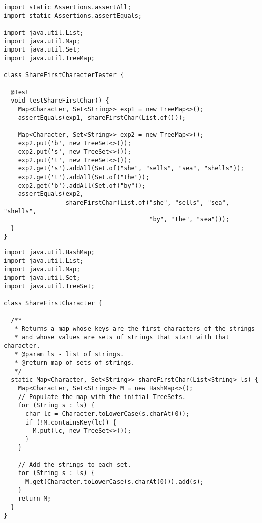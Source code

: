 \begin{lstlisting}[language=MyJava]
import static Assertions.assertAll;
import static Assertions.assertEquals;

import java.util.List;
import java.util.Map;
import java.util.Set;
import java.util.TreeMap;

class ShareFirstCharacterTester {
  
  @Test
  void testShareFirstChar() {
    Map<Character, Set<String>> exp1 = new TreeMap<>();
    assertEquals(exp1, shareFirstChar(List.of()));

    Map<Character, Set<String>> exp2 = new TreeMap<>();
    exp2.put('b', new TreeSet<>());
    exp2.put('s', new TreeSet<>());
    exp2.put('t', new TreeSet<>());
    exp2.get('s').addAll(Set.of("she", "sells", "sea", "shells"));
    exp2.get('t').addAll(Set.of("the"));
    exp2.get('b').addAll(Set.of("by"));
    assertEquals(exp2, 
                 shareFirstChar(List.of("she", "sells", "sea", "shells", 
                                        "by", "the", "sea")));
  }
}
\end{lstlisting}

\begin{lstlisting}[language=MyJava]
import java.util.HashMap;
import java.util.List;
import java.util.Map;
import java.util.Set;
import java.util.TreeSet;

class ShareFirstCharacter {

  /**
   * Returns a map whose keys are the first characters of the strings
   * and whose values are sets of strings that start with that character.
   * @param ls - list of strings.
   * @return map of sets of strings.
   */
  static Map<Character, Set<String>> shareFirstChar(List<String> ls) {
    Map<Character, Set<String>> M = new HashMap<>();
    // Populate the map with the initial TreeSets.
    for (String s : ls) {
      char lc = Character.toLowerCase(s.charAt(0));
      if (!M.containsKey(lc)) {
        M.put(lc, new TreeSet<>());
      }
    }

    // Add the strings to each set.
    for (String s : ls) {
      M.get(Character.toLowerCase(s.charAt(0))).add(s);
    }
    return M;
  }
}
\end{lstlisting}



